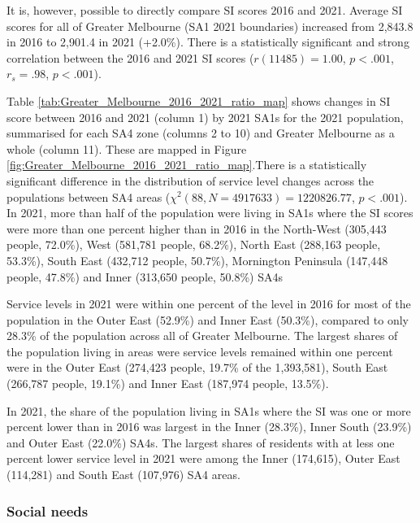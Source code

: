 \documentclass[preprint, 3p,
authoryear]{elsarticle} %
\begin{document}
It is, however, possible to directly compare SI scores 2016 and 2021.
Average SI scores for all of Greater Melbourne (SA1 2021 boundaries)
increased from 2,843.8 in 2016 to 2,901.4 in 2021 (+2.0\%). There is a
statistically significant and strong correlation between the 2016 and
2021 SI scores (\(r(11485) = 1.00\), \(p < .001\), \(r_s =.98\),
\(p < .001\)).

Table \ref{tab:Greater_Melbourne_2016_2021_ratio_map} shows changes in
SI score between 2016 and 2021 (column 1) by 2021 SA1s for the 2021
population, summarised for each SA4 zone (columns 2 to 10) and Greater
Melbourne as a whole (column 11). These are mapped in Figure
\ref{fig:Greater_Melbourne_2016_2021_ratio_map}.There is a statistically
significant difference in the distribution of service level changes
across the populations between SA4 areas
(\(\chi^2(88, N = 4917633) = 1220826.77\), \(p < .001\)). In 2021, more
than half of the population were living in SA1s where the SI scores were
more than one percent higher than in 2016 in the North-West (305,443
people, 72.0\%), West (581,781 people, 68.2\%), North East (288,163
people, 53.3\%), South East (432,712 people, 50.7\%), Mornington
Peninsula (147,448 people, 47.8\%) and Inner (313,650 people, 50.8\%)
SA4s

Service levels in 2021 were within one percent of the level in 2016 for
most of the population in the Outer East (52.9\%) and Inner East
(50.3\%), compared to only 28.3\% of the population across all of
Greater Melbourne. The largest shares of the population living in areas
were service levels remained within one percent were in the Outer East
(274,423 people, 19.7\% of the 1,393,581), South East (266,787 people,
19.1\%) and Inner East (187,974 people, 13.5\%).

In 2021, the share of the population living in SA1s where the SI was one
or more percent lower than in 2016 was largest in the Inner (28.3\%),
Inner South (23.9\%) and Outer East (22.0\%) SA4s. The largest shares of
residents with at less one percent lower service level in 2021 were
among the Inner (174,615), Outer East (114,281) and South East (107,976)
SA4 areas.

\hypertarget{social-needs}{%
\subsubsection{Social needs}\label{social-needs}}
\end{document}
